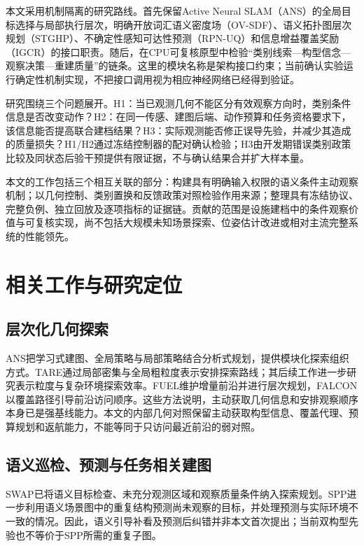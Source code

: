 \documentclass[11pt,a4paper]{article}
\begin{document}
本文采用机制隔离的研究路线。首先保留Active Neural SLAM（ANS）的全局目标选择与局部执行层次\cite{chaplot2020}，明确开放词汇语义密度场（OV-SDF）、语义拓扑图层次规划（STGHP）、不确定性感知可达性预测（RPN-UQ）和信息增益覆盖奖励（IGCR）的接口职责。随后，在CPU可复核原型中检验“类别线索—构型信念—观察决策—重建质量”的链条。这里的模块名称是架构接口约束；当前确认实验运行确定性机制实现，不把接口调用视为相应神经网络已经得到验证。

研究围绕三个问题展开。H1：当已观测几何不能区分有效观察方向时，类别条件信息是否改变动作？H2：在同一传感、建图后端、动作预算和任务资格要求下，该信息能否提高联合建档结果？H3：实际观测能否修正误导先验，并减少其造成的质量损失？H1/H2通过冻结控制器的配对确认检验；H3由开发期错误类别政策比较及同状态后验干预提供有限证据，不与确认结果合并扩大样本量。

本文的工作包括三个相互关联的部分：构建具有明确输入权限的语义条件主动观察机制；以几何控制、类别置换和反馈政策对照检验作用来源；整理具有冻结协议、完整负例、独立回放及逐项指标的证据链。贡献的范围是设施建档中的条件观察价值与可复核实现，尚不包括大规模未知场景探索、位姿估计改进或相对主流完整系统的性能领先。

\section{相关工作与研究定位}
\subsection{层次化几何探索}
ANS把学习式建图、全局策略与局部策略结合分析式规划，提供模块化探索组织方式\cite{chaplot2020}。TARE通过局部密集与全局粗粒度表示安排探索路线；其后续工作进一步研究表示粒度与复杂环境探索效率\cite{cao2021tare,cao2023granularity}。FUEL维护增量前沿并进行层次规划，FALCON以覆盖路径引导前沿访问顺序\cite{zhou2021fuel,zhang2025falcon}。这些方法说明，主动获取几何信息和安排观察顺序本身已是强基线能力。本文的内部几何对照保留主动获取构型信息、覆盖代理、预算规划和返航能力，不能等同于只访问最近前沿的弱对照。

\subsection{语义巡检、预测与任务相关建图}
SWAP已将语义目标检查、未充分观测区域和观察质量条件纳入探索规划\cite{dharmadhikari2023swap}。SPP进一步利用语义场景图中的重复结构预测尚未观察的目标，并处理预测与实际环境不一致的情况\cite{dharmadhikari2025spp}。因此，语义引导补看及预测后纠错并非本文首次提出；当前双构型先验也不等价于SPP所需的重复子图。
\end{document}

